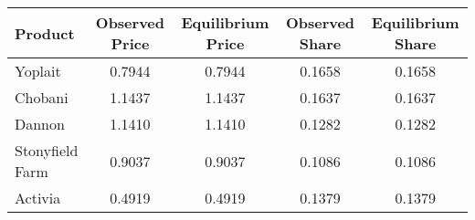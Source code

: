 \begin{tabular}{lcccc}
\hline
Product & Observed Price & Equilibrium Price & Observed Share & Equilibrium Share \\
\hline
Yoplait & 0.7944 & 0.7944 & 0.1658 & 0.1658 \\
Chobani & 1.1437 & 1.1437 & 0.1637 & 0.1637 \\
Dannon & 1.1410 & 1.1410 & 0.1282 & 0.1282 \\
Stonyfield Farm & 0.9037 & 0.9037 & 0.1086 & 0.1086 \\
Activia & 0.4919 & 0.4919 & 0.1379 & 0.1379 \\
\hline
\end{tabular}